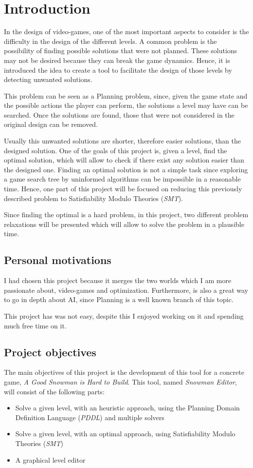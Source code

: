 \documentclass{report}
\theoremstyle{plain}
\begin{document}
\tableofcontents

\chapter{Introduction}
In the design of video-games, one of the most important aspects to consider is the difficulty in the design of the different levels. A common problem is the possibility of finding possible solutions that were not planned. These solutions may not be desired because they can break the game dynamics. Hence, it is introduced the idea to create a tool to facilitate the design of those levels by detecting unwanted solutions.

This problem can be seen as a Planning problem, since, given the game state and the possible actions the player can perform, the solutions a level may have can be searched. Once the solutions are found, those that were not considered in the original design can be removed.

Usually this unwanted solutions are shorter, therefore easier solutions, than the designed solution. One of the goals of this project is, given a level, find the optimal solution, which will allow to check if there exist any solution easier than the designed one. Finding an optimal solution is not a simple task since exploring a game search tree by uninformed algorithms can be impossible in a reasonable time. Hence, one part of this project will be focused on reducing this previously described problem to Satisfiability Modulo Theories (\emph{SMT}).

Since finding the optimal is a hard problem, in this project, two different problem relaxations will be presented which will allow to solve the problem in a plausible time.

\section{Personal motivations}
I had chosen this project because it merges the two worlds which I am more passionate about, video-games and optimization. Furthermore, is also a great way to go in depth about AI, since Planning is a well known branch of this topic.

This project has was not easy, despite this I enjoyed working on it and spending much free time on it. 

\section{Project objectives}
The main objectives of this project is the development of this tool for a concrete game, \emph{A Good Snowman is Hard to Build}. This tool, named \emph{Snowman Editor}, will consist of the following parts:
\begin{itemize}
    \item Solve a given level, with an heuristic approach, using the Planning Domain Definition Language (\emph{PDDL}) and multiple solvers
    \item Solve a given level, with an optimal approach, using Satisfiability Modulo Theories (\emph{SMT}) 
    \item A graphical level editor
\end{itemize}
\end{document}
